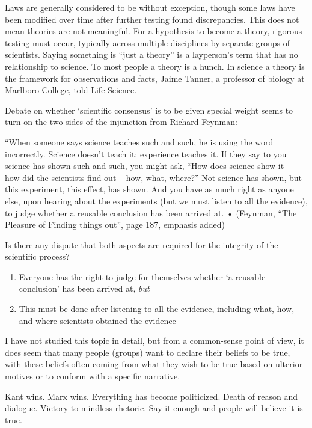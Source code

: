 Laws are generally considered to be without exception, though some laws have been modified over time after further testing found discrepancies. This does not mean theories are not meaningful. For a hypothesis to become a theory, rigorous testing must occur, typically across multiple disciplines by separate groups of scientists. Saying something is ``just a theory'' is a layperson’s term that has no relationship to science. To most people a theory is a hunch. In science a theory is the framework for observations and facts, Jaime Tanner, a professor of biology at Marlboro College, told Life Science.

Debate on whether `scientific consensus’ is to be given special weight seems to turn on the two-sides of the injunction from Richard Feynman:

“When someone says science teaches such and such, he is using the word incorrectly. Science doesn’t teach it; experience teaches it. If they say to you science has shown such and such, you might ask, “How does science show it – how did the scientists find out – how, what, where?”  Not science has shown, but this experiment, this effect, has shown. And you have as much right as anyone else, upon hearing about the experiments (but we must listen to all the evidence), to judge whether a reusable conclusion has been arrived at.
    • (Feynman, “The Pleasure of Finding things out”, page 187, emphasis added)
    
Is there any dispute that both aspects are required for the integrity of the scientific process?

\begin{enumerate}
\item Everyone has the right to judge for themselves whether `a reusable conclusion’ has been arrived at, \textit{but}
\item This must be done after listening to all the evidence, including what, how, and where scientists obtained the evidence
\end{enumerate}

I have not studied this topic in detail, but from a common-sense point of view, it does seem that many people (groups) want to declare their beliefs to be true, with these beliefs often coming from what they wish to be true based on ulterior motives or to conform with a specific narrative.

Kant wins. Marx wins. Everything has become politicized. Death of reason and dialogue. Victory to mindless rhetoric. Say it enough and people will believe it is true.

